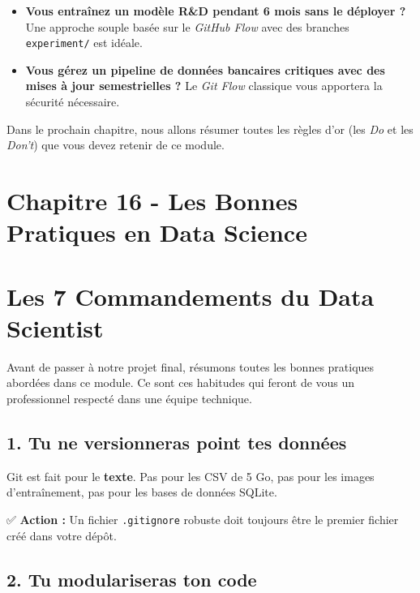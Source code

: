 \documentclass[
  letterpaper,
  DIV=11,
  numbers=noendperiod]{scrreprt}
\begin{document}
\begin{itemize}
\item
  \textbf{Vous entraînez un modèle R\&D pendant 6 mois sans le déployer
  ?} Une approche souple basée sur le \emph{GitHub Flow} avec des
  branches \texttt{experiment/} est idéale.
\item
  \textbf{Vous gérez un pipeline de données bancaires critiques avec des
  mises à jour semestrielles ?} Le \emph{Git Flow} classique vous
  apportera la sécurité nécessaire.
\end{itemize}

Dans le prochain chapitre, nous allons résumer toutes les règles d'or
(les \emph{Do} et les \emph{Don't}) que vous devez retenir de ce module.


\section{Chapitre 16 - Les Bonnes Pratiques en Data
Science}\label{chapitre-16---les-bonnes-pratiques-en-data-science}


\section{Les 7 Commandements du Data
Scientist}\label{les-7-commandements-du-data-scientist}

Avant de passer à notre projet final, résumons toutes les bonnes
pratiques abordées dans ce module. Ce sont ces habitudes qui feront de
vous un professionnel respecté dans une équipe technique.

\subsection{1. Tu ne versionneras point tes
données}\label{tu-ne-versionneras-point-tes-donnuxe9es}

Git est fait pour le \textbf{texte}. Pas pour les CSV de 5 Go, pas pour
les images d'entraînement, pas pour les bases de données SQLite.

✅ \textbf{Action :} Un fichier \texttt{.gitignore} robuste doit
toujours être le premier fichier créé dans votre dépôt.

\subsection{2. Tu modulariseras ton
code}\label{tu-modulariseras-ton-code}
\end{document}
